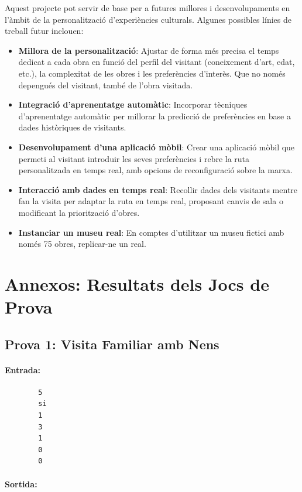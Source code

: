 \documentclass[a4paper]{article}
\begin{document}
	Aquest projecte pot servir de base per a futures millores i desenvolupaments en l'àmbit de la personalització d'experiències culturals. Algunes possibles línies de treball futur inclouen:
	
	\begin{itemize}
		\item \textbf{Millora de la personalització}: Ajustar de forma més precisa el temps dedicat a cada obra en funció del perfil del visitant (coneixement d'art, edat, etc.), la complexitat de les obres i les preferències d'interès. Que no només depengués del visitant, també de l'obra visitada.
		\item \textbf{Integració d'aprenentatge automàtic}: Incorporar tècniques d'aprenentatge automàtic per millorar la predicció de preferències en base a dades històriques de visitants.
		\item \textbf{Desenvolupament d'una aplicació mòbil}: Crear una aplicació mòbil que permeti al visitant introduir les seves preferències i rebre la ruta personalitzada en temps real, amb opcions de reconfiguració sobre la marxa.
		\item \textbf{Interacció amb dades en temps real}: Recollir dades dels visitants mentre fan la visita per adaptar la ruta en temps real, proposant canvis de sala o modificant la priorització d'obres.
		\item \textbf{Instanciar un museu real}: En comptes d'utilitzar un museu fictici amb només 75 obres, replicar-ne un real.
	\end{itemize}
	
	\newpage
	\section{Annexos: Resultats dels Jocs de Prova}
	\label{sec:annex}
	\subsection{Prova 1: Visita Familiar amb Nens}
	\paragraph{Entrada:}
	
	\begin{verbatim}
		5
		si
		1
		3
		1
		0
		0
	\end{verbatim}
	
	\paragraph{Sortida:\\}
		
\end{document}
